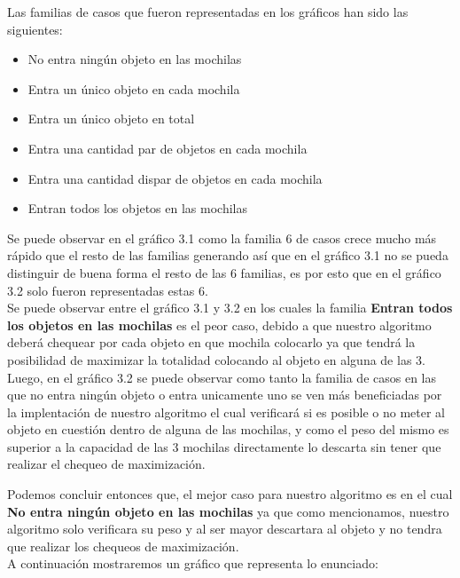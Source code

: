 Las familias de casos que fueron representadas en los gr\'aficos han sido las siguientes:\\
\begin{itemize}
\item No entra ning\'un objeto en las mochilas
\item Entra un \'unico objeto en cada mochila
\item Entra un \'unico objeto en total
\item Entra una cantidad par de objetos en cada mochila
\item Entra una cantidad dispar de objetos en cada mochila
\item Entran todos los objetos en las mochilas
\end{itemize}

Se puede observar en el gr\'afico 3.1 como la familia 6 de casos crece mucho m\'as r\'apido que el resto de las familias generando as\'i que en el gr\'afico 3.1 no se pueda distinguir de buena forma el resto de las 6 familias, es por esto que en el gr\'afico 3.2 solo fueron representadas estas 6.\\

Se puede observar entre el gr\'afico 3.1 y 3.2 en los cuales la familia \textbf{Entran todos los objetos en las mochilas} es el peor caso, debido a que nuestro algoritmo deber\'a chequear por cada objeto en que mochila colocarlo ya que tendr\'a la posibilidad de maximizar la totalidad colocando al objeto en alguna de las 3.\\

Luego, en el gr\'afico 3.2 se puede observar como tanto la familia de casos en las que no entra ning\'un objeto o entra unicamente uno se ven m\'as beneficiadas por la implentaci\'on de nuestro algoritmo el cual verificar\'a si es posible o no meter al objeto en cuesti\'on dentro de alguna de las mochilas, y como el peso del mismo es superior a la capacidad de las 3 mochilas directamente lo descarta sin tener que realizar el chequeo de maximizaci\'on.

Podemos concluir entonces que, el mejor caso para nuestro algoritmo es en el cual \textbf{No entra ning\'un objeto en las mochilas} ya que como mencionamos, nuestro algoritmo solo verificara su peso y al ser mayor descartara al objeto y no tendra que realizar los chequeos de maximizaci\'on.\\

A continuaci\'on mostraremos un gr\'afico que representa lo enunciado:

